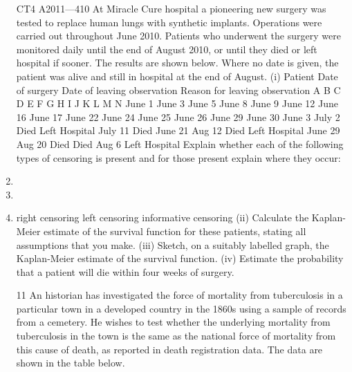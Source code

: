 \documentclass[a4paper,12pt]{article}
\begin{document}
\begin{enumerate}
CT4 A2011—410
At Miracle Cure hospital a pioneering new surgery was tested to replace human lungs with synthetic implants. Operations were carried out throughout June 2010. Patients who underwent the surgery were monitored daily until the end of August 2010, or until they died or left hospital if sooner. The results are shown below. Where no date is given, the patient was alive and still in hospital at the end of August.
(i)
Patient Date of surgery Date of leaving
observation Reason for
leaving
observation
A
B
C
D
E
F
G
H
I
J
K
L
M
N June 1
June 3
June 5
June 8
June 9
June 12
June 16
June 17
June 22
June 24
June 25
June 26
June 29
June 30 June 3
July 2 Died
Left Hospital
July 11 Died
June 21
Aug 12 Died
Left Hospital
June 29
Aug 20 Died
Died
Aug 6 Left Hospital
Explain whether each of the following types of censoring is present and for
those present explain where they occur:
\item
\item
\item
right censoring
left censoring
informative censoring
(ii) Calculate the Kaplan-Meier estimate of the survival function for these patients, stating all assumptions that you make.
(iii) Sketch, on a suitably labelled graph, the Kaplan-Meier estimate of the survival function.
(iv) Estimate the probability that a patient will die within four weeks of surgery.

11
An historian has investigated the force of mortality from tuberculosis in a particular town in a developed country in the 1860s using a sample of records from a cemetery. He wishes to test whether the underlying mortality from tuberculosis in the town is
the same as the national force of mortality from this cause of death, as reported in death registration data. The data are shown in the table below.


\end{enumerate}
\end{document}
